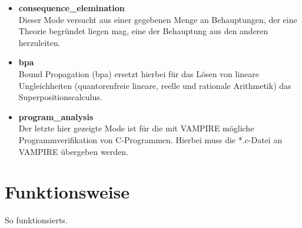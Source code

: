 \documentclass{acm_proc_article-sp-german}
\begin{document}
\begin{itemize}
\item \textbf{consequence\_elemination} \\
		 Dieser Mode versucht aus einer gegebenen Menge an Behauptungen, der eine Theorie begründet liegen mag, eine der Behauptung aus den anderen herzuleiten.\\
\item \textbf{bpa} \\
		Bound Propagation (bpa) ersetzt hierbei für das Lösen von lineare Ungleichheiten (quantorenfreie lineare, reelle und rationale Arithmetik) das Superpositionscalculus.
\item \textbf{program\_analysis} \\
		Der letzte hier gezeigte Mode ist für die mit VAMPIRE mögliche Programmverifikation von C-Programmen. Hierbei muss die *.c-Datei an VAMPIRE übergeben werden.
\end{itemize}







\section{Funktionsweise}
\label{sec:mechanics}
So funktionsierts.
\end{document}
